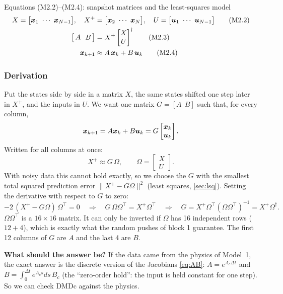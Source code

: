 \begin{eqbox}{Equations (M2.2)--(M2.4): snapshot matrices and the least-squares model}
\begin{align}
  X=\big[\vx_1\ \cdots\ \vx_{N-1}\big],\quad X^+&=\big[\vx_2\ \cdots\ \vx_{N}\big],\quad U=\big[\vu_1\ \cdots\ \vu_{N-1}\big] \tag{M2.2}\\
  \big[\,A\ \ B\,\big]&=X^+\begin{bmatrix}X\\ U\end{bmatrix}^{\dagger} \tag{M2.3}\\
  \vx_{k+1}&\approx A\,\vx_k+B\,\vu_k \tag{M2.4}
\end{align}
\end{eqbox}

\subsubsection*{Derivation}
Put the states side by side in a matrix $X$, the same states shifted one step later in $X^+$, and the inputs in $U$. We want
one matrix $G=[A\ \ B]$ such that, for every column,
\[
\bm{x}_{k+1}=A\bm{x}_k+B\bm{u}_k=G\begin{bmatrix}\bm{x}_k\\ \bm{u}_k\end{bmatrix}.
\]
Written for all columns at once:
\[
X^+\approx G\,\Omega,\qquad \Omega=\begin{bmatrix}X\\U\end{bmatrix}.
\]
With noisy data this cannot hold exactly, so we choose the $G$ with the smallest total squared prediction error
$\|X^+-G\Omega\|^2$ (least squares, \cref{sec:lsq}). Setting the derivative with respect to $G$ to zero:
\[
-2\,(X^+-G\Omega)\,\Omega^\top=0\quad\Longrightarrow\quad G\,\Omega\Omega^\top=X^+\Omega^\top
\quad\Longrightarrow\quad G=X^+\Omega^\top(\Omega\Omega^\top)^{-1}=X^+\Omega^\dagger .
\]
$\Omega\Omega^\top$ is a $16\times16$ matrix. It can only be inverted if $\Omega$ has 16 independent rows ($12+4$), which is
exactly what the random pushes of block 1 guarantee. The first 12 columns of $G$ are $A$ and the last 4 are $B$.

\textbf{What should the answer be?} If the data came from the physics of Model~1, the exact answer is the discrete
version of the Jacobians \eqref{eq:AB}: $A=e^{A_c\Delta t}$ and $B=\int_0^{\Delta t}e^{A_cs}ds\,B_c$ (the ``zero-order hold'':
the input is held constant for one step). So we can check DMDc against the physics.

